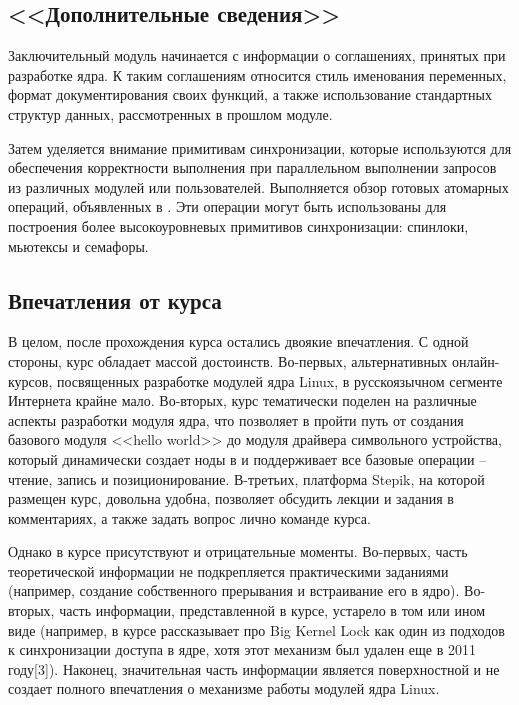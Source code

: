 
\subsection{<<Дополнительные сведения>>}

Заключительный модуль начинается с информации о соглашениях, принятых при разработке ядра. К таким соглашениям относится стиль именования переменных, формат документирования своих функций, а также использование стандартных структур данных, рассмотренных в прошлом модуле.

Затем уделяется внимание примитивам синхронизации, которые используются для обеспечения корректности выполнения при параллельном выполнении запросов из различных модулей или пользователей. Выполняется обзор готовых атомарных операций, объявленных в . Эти операции могут быть использованы для построения более высокоуровневых примитивов синхронизации: спинлоки, мьютексы и семафоры.

\subsection{Впечатления от курса}

В целом, после прохождения курса остались двоякие впечатления. С одной стороны, курс обладает массой достоинств. Во-первых, альтернативных онлайн-курсов, посвященных разработке модулей ядра Linux, в русскоязычном сегменте Интернета крайне мало. Во-вторых, курс тематически поделен на различные аспекты разработки модуля ядра, что позволяет в пройти путь от создания базового модуля <<hello world>> до модуля драйвера символьного устройства, который динамически создает ноды в  и поддерживает все базовые операции -- чтение, запись и позиционирование. В-третьих, платформа Stepik, на которой размещен курс, довольна удобна, позволяет обсудить лекции и задания в комментариях, а также задать вопрос лично команде курса.

Однако в курсе присутствуют и отрицательные моменты. Во-первых, часть теоретической информации не подкрепляется практическими заданиями (например, создание собственного прерывания и встраивание его в ядро). Во-вторых, часть информации, представленной в курсе, устарело в том или ином виде (например, в курсе рассказывает про Big Kernel Lock как один из подходов к синхронизации доступа в ядре, хотя этот механизм был удален еще в 2011 году[3]). Наконец, значительная часть информации является поверхностной и не создает полного впечатления о механизме работы модулей ядра Linux.

